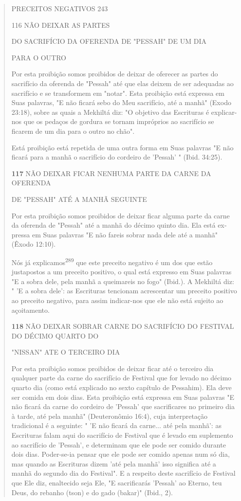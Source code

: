 \begin{quote}
PRECEITOS NEGATIVOS 243

116 NÃO DEIXAR AS PARTES

DO SACRIFÍCIO DA OFERENDA DE "PESSAH" DE UM DIA

PARA O OUTRO

Por esta proibição somos proibidos de deixar de oferecer as partes do
sacrifício da oferenda de "Pessah" até que elas deixem de ser adequadas
ao sacrifício e se transformem em "notar". Esta proibição está expressa
em Suas palavras, "E não ficará sebo do Meu sacrifício, até a manhã"
(Exodo 23:18), sobre as quais a Mekhiltá diz: "O objetivo das Escrituras
é explicar-nos que os pedaços de gordura se tornam impróprios ao
sacrifício se ficarem de um dia para o outro no chão".

Está proibição está repetida de uma outra forma em Suas palavras "E não
ficará para a manhã o sacrifício do cordeiro de 'Pessah' " (Ibid.
34:25).

\textbf{117} NÃO DEIXAR FICAR NENHUMA PARTE DA CARNE DA OFERENDA

DE "PESSAH" ATÉ A MANHÃ SEGUINTE

Por esta proibição somos proibidos de deixar ficar alguma parte da carne
da oferenda de "Pessah" até a manhã do décimo quinto dia. Ela está
ex­pressa em Suas palavras "E não fareis sobrar nada dele até a manhã"
(Êxodo 12:10).

Nós já explicamos\textsuperscript{289} que este preceito negativo é um
dos que es­tão justapostos a um preceito positivo, o qual está expresso
em Suas palavras "E a sobra dele, pela manhã a queimareis no fogo"
(Ibid.). A Mekhiltá diz: " 'E a sobra dele': as Escrituras tencionam
acrescentar um preceito positivo ao pre­ceito negativo, para assim
indicar-nos que ele não está sujeito ao açoitamento.

\textbf{118} NÃO DEIXAR SOBRAR CARNE DO SACRIFÍCIO DO FESTIVAL DO DÉCIMO
QUARTO DO

"NISSAN" ATE O TERCEIRO DIA

Por esta proibição somos proibidos de deixar ficar até o terceiro dia
qualquer parte da carne do sacrifício de Festival que for levado no
décimo quarto dia (como está explicado no sexto capítulo de Pessahim).
Ela deve ser comida em dois dias. Esta proibição está expressa em Suas
palavras "E não ficará da carne do cordeiro de 'Pessah' que sacrificares
no primeiro dia à tarde, até pela manhã" (Deuteronômio 16:4), cuja
interpretação tradicional é a seguinte: " 'E não ficará da carne... até
pela manhã': as Escrituras falam aqui do sacrifício de Festival que é
levado em suplemento ao sacrifício de 'Pessah', e determinam que ele
pode ser comido durante dois dias. Poder-se-ia pensar que ele pode ser
comido apenas num só dia, mas quando as Escrituras dizem 'até pela
manhã' isso significa até a manhã do segundo dia do Festival". E a
respeito deste sacri­fício de Festival que Ele diz, enaltecido seja Ele,
"E sacrificarás 'Pessah' ao Eter­no, teu Deus, do rebanho (tson) e do
gado (bakar)" (Ibid., 2).


\end{quote}
